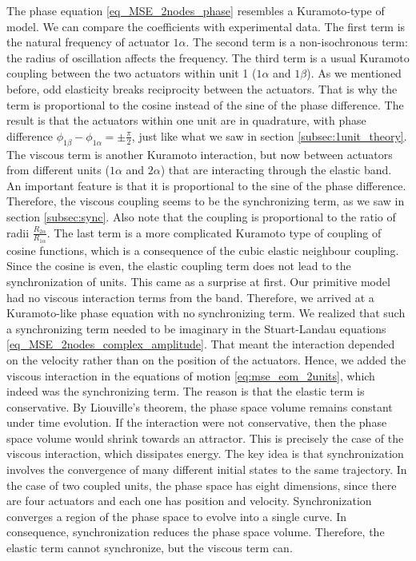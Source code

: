 \documentclass[11pt, a4paper]{article} %
\begin{document}
The phase equation \eqref{eq_MSE_2nodes_phase} resembles a Kuramoto-type of model. 
We can compare the coefficients with experimental data. The first term is the natural frequency of actuator $1\alpha$. 
The second term is a non-isochronous term: the radius of oscillation affects the frequency. 
The third term is a usual Kuramoto coupling between the two actuators within unit 1 ($1\alpha$ and $1\beta$). 
As we mentioned before, odd elasticity breaks reciprocity between the actuators. That is why the term is proportional to 
the cosine instead of the sine of the phase difference. The result is that the actuators within one unit are in quadrature, 
with phase difference $\phi_{1\beta}-\phi_{1\alpha} = \pm \frac{\pi}{2}$, just like what we saw in section \ref{subsec:1unit_theory}. 
The viscous term is another Kuramoto interaction, but now between actuators from different units 
($1\alpha$ and $2\alpha$) that are interacting through the elastic band. An important feature is that it is proportional to the sine of the phase difference.
Therefore, the viscous coupling seems to be the synchronizing term, as we saw in section \ref{subsec:sync}.
Also note that the coupling is proportional to the ratio of radii $\frac{R_{2\alpha}}{R_{1\alpha}}$. 
The last term is a more complicated Kuramoto type of coupling of cosine functions, 
which is a consequence of the cubic elastic neighbour coupling. Since the cosine is even, the elastic coupling term
does not lead to the synchronization of units. This came as a surprise at first. Our primitive model had no viscous interaction 
terms from the band. Therefore, we arrived at a Kuramoto-like phase equation with no synchronizing term. 
We realized that such a synchronizing term needed to be imaginary in the Stuart-Landau equations \eqref{eq_MSE_2nodes_complex_amplitude}.
That meant the interaction depended on the velocity rather than on the position of the actuators. Hence, we added the viscous 
interaction in the equations of motion \eqref{eq:mse_eom_2units}, which indeed was the synchronizing term. 
The reason is that the elastic term is conservative. By Liouville's theorem, the phase space volume remains constant under time evolution. 
If the interaction were not conservative, then the phase space volume would shrink towards an attractor. This is precisely 
the case of the viscous interaction, which dissipates energy. The key idea is that synchronization involves the convergence 
of many different initial states to the same trajectory. In the case of two coupled units, the phase space has eight dimensions,
since there are four actuators and each one has position and velocity. Synchronization converges a region of the phase space to 
evolve into a single curve. In consequence, synchronization reduces the phase space volume. Therefore, the elastic term 
cannot synchronize, but the viscous term can.
\end{document}
